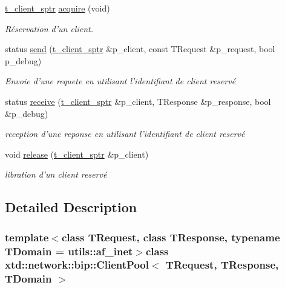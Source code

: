 \begin{DoxyCompactItemize}
\item 
\hyperlink{classxtd_1_1network_1_1bip_1_1ClientPool_ac3b215a76aeb124011801824f993a52b}{t\-\_\-client\-\_\-sptr} \hyperlink{classxtd_1_1network_1_1bip_1_1ClientPool_a9d2d89926ce38e5fbb73ef297945c586}{acquire} (void)
\begin{DoxyCompactList}\small\item\em Réservation d'un client. \end{DoxyCompactList}\item 
status \hyperlink{classxtd_1_1network_1_1bip_1_1ClientPool_a1cba2c44a7995319a0aa2bbb7f823ff4}{send} (\hyperlink{classxtd_1_1network_1_1bip_1_1ClientPool_ac3b215a76aeb124011801824f993a52b}{t\-\_\-client\-\_\-sptr} \&p\-\_\-client, const T\-Request \&p\-\_\-request, bool p\-\_\-debug)
\begin{DoxyCompactList}\small\item\em Envoie d'une requete en utilisant l'identifiant de client reservé \end{DoxyCompactList}\item 
status \hyperlink{classxtd_1_1network_1_1bip_1_1ClientPool_a5884f162a9ca3dee26768eb1f683b6ec}{receive} (\hyperlink{classxtd_1_1network_1_1bip_1_1ClientPool_ac3b215a76aeb124011801824f993a52b}{t\-\_\-client\-\_\-sptr} \&p\-\_\-client, T\-Response \&p\-\_\-response, bool \&p\-\_\-debug)
\begin{DoxyCompactList}\small\item\em reception d'une reponse en utilisant l'identifiant de client reservé \end{DoxyCompactList}\item 
void \hyperlink{classxtd_1_1network_1_1bip_1_1ClientPool_a390ed6d8afa1812690fbe120bdea5059}{release} (\hyperlink{classxtd_1_1network_1_1bip_1_1ClientPool_ac3b215a76aeb124011801824f993a52b}{t\-\_\-client\-\_\-sptr} \&p\-\_\-client)
\begin{DoxyCompactList}\small\item\em libration d'un client reservé \end{DoxyCompactList}\end{DoxyCompactItemize}


\subsection{Detailed Description}
\subsubsection*{template$<$class T\-Request, class T\-Response, typename T\-Domain = utils\-::af\-\_\-inet$>$class xtd\-::network\-::bip\-::\-Client\-Pool$<$ T\-Request, T\-Response, T\-Domain $>$}



